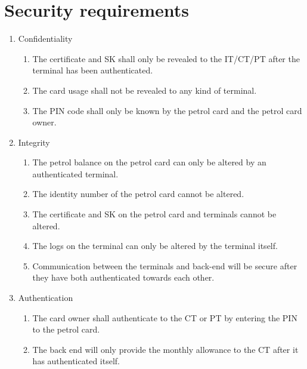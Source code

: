 
\section{Security requirements}

\begin{enumerate}
\item Confidentiality
	\begin{enumerate}
	\item The certificate and SK shall only be revealed to the IT/CT/PT after the terminal has been authenticated.
	\item The card usage shall not be revealed to any kind of terminal.
	\item The PIN code shall only be known by the petrol card and the petrol card owner. 
	\end{enumerate}
\item Integrity
	\begin{enumerate}
	\item The petrol balance on the petrol card can only be altered by an authenticated terminal.
	\item The identity number of the petrol card cannot be altered. 
	\item The certificate and SK on the petrol card and terminals cannot be altered.
	\item The logs on the terminal can only be altered by the terminal itself. 
	\item Communication between the terminals and back-end will be secure after they have both authenticated towards each other.
	\end{enumerate}

\item Authentication
		\begin{enumerate}
		\item The card owner shall authenticate to the CT or PT by entering the PIN to the petrol card.
		\item The back end will only provide the monthly allowance to the CT after it has authenticated itself.


\end{enumerate}
\end{enumerate}
